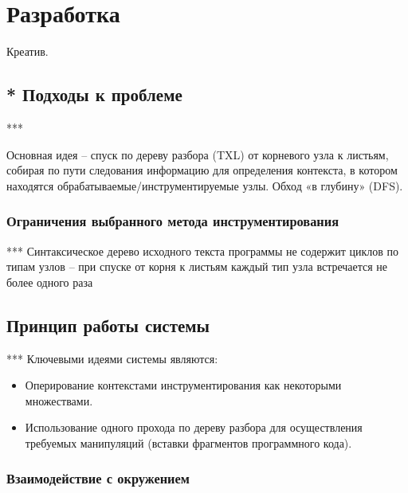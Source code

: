 \chapter{Разработка}

Креатив.

\section{* Подходы к проблеме}

***

Основная идея -- спуск по дереву разбора (TXL) от корневого узла к листьям, собирая по пути следования информацию для определения контекста, в котором находятся обрабатываемые/инструментируемые узлы.
Обход «в глубину» (DFS).

\subsection{Ограничения выбранного метода инструментирования}

***
Синтаксическое дерево исходного текста программы не содержит циклов по типам узлов -- при спуске от корня к листьям каждый тип узла встречается не более одного раза

\section{Принцип работы системы}

***
Ключевыми идеями системы являются:
\begin{itemize}
  \item Оперирование контекстами инструментирования как некоторыми множествами.
  \item Использование одного прохода по дереву разбора для осуществления требуемых манипуляций (вставки фрагментов программного кода).
\end{itemize}

\subsection{Взаимодействие с окружением}

